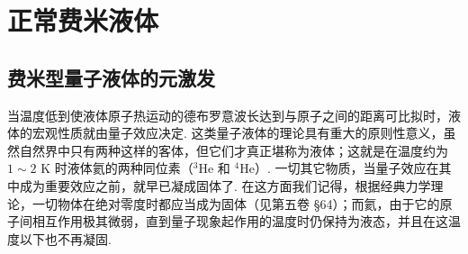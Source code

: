%
%
\chapter{正常费米液体}

\section{费米型量子液体的元激发}

当温度低到使液体原子热运动的德布罗意波长达到与原子之间的距离可比拟时，液体的宏观性质就由量子效应决定. 这类量子液体的理论具有重大的原则性意义，虽然自然界中只有两种这样的客体，但它们才真正堪称为液体；这就是在温度约为 $1\sim2$ K 时液体氦的两种同位素（$^{3}$He 和 $^{4}$He）. 一切其它物质，当量子效应在其中成为重要效应之前，就早已凝成固体了. 在这方面我们记得，根据经典力学理论，一切物体在绝对零度时都应当成为固体（见第五卷 §64）；而氦，由于它的原子间相互作用极其微弱，直到量子现象起作用的温度时仍保持为液态，并且在这温度以下也不再凝固.

